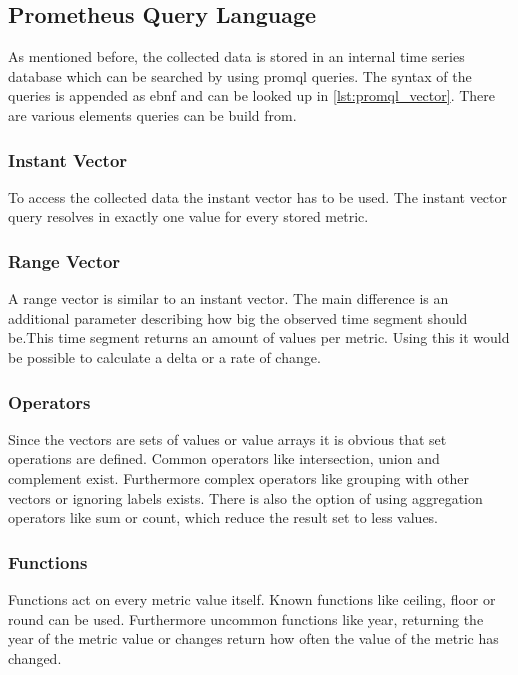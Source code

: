 \subsection{Prometheus Query Language}
\label{subsec:promql}
As mentioned before, the collected data is stored in an internal time series database which can be searched by using \gls{promql} queries.
The syntax of the queries is appended as \gls{ebnf} and can be looked up in \autoref{lst:promql_vector}.
There are various elements queries can be build from.
\subsubsection{Instant Vector}
To access the collected data the instant vector has to be used. The instant vector query resolves in exactly one value for every stored metric.
\subsubsection{Range Vector}
A range vector is similar to an instant vector. The main difference is an additional parameter describing how big the observed time segment should be.This time segment returns an amount of values per metric. Using this it would be possible to calculate a delta or a rate of change.
\subsubsection{Operators}
Since the vectors are sets of values or value arrays it is obvious that set operations are defined. Common operators like intersection, union and complement exist. Furthermore complex operators like grouping with other vectors or ignoring labels exists. There is also the option of using aggregation operators like sum or count, which reduce the result set to less values.
\subsubsection{Functions}
Functions act on every metric value itself. Known functions like ceiling, floor or round can be used. Furthermore uncommon functions like year, returning the year of the metric value or changes return how often the value of the metric has changed.

